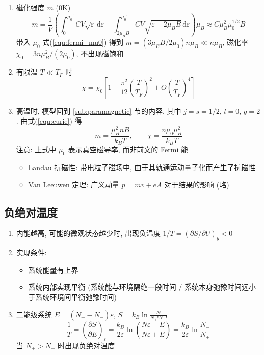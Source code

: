 \documentclass[12pt,a4paper]{article}%
\numberwithin{equation}{section}
\newcommand{\diff}{\,\mathrm{d}}
\begin{document}
\begin{enumerate}
    \item 磁化强度 $m$ ($0$K)
    \begin{equation}
        m = \frac 1V\left(\int_0^{\mu_0'}CV\sqrt\varepsilon\diff\varepsilon - \int_{2\mu_BB}^{\mu_0'}CV\sqrt{\varepsilon-2\mu_BB}\diff\varepsilon\right)\mu_B
        \approx C\mu_B^2\mu_0^{1/2}B
    \end{equation}
    带入 $\mu_0$ 式(\ref{equ:fermi_mu0}) 得到 $m = (3\mu_BB/2\mu_0)n\mu_B \ll n\mu_B$, 磁化率 $\chi_0 = 3n\mu_B^2/(2\mu_0)$, 不出现磁饱和
    \item 有限温 $T\ll T_F$ 时
    \begin{equation}
        \chi = \chi_0\left[1-\frac{\pi^2}{12}\left(\frac{T}{T_F}\right)^2 + O\left(\frac{T}{T_F}\right)^4\right]
    \end{equation}
    \item 高温时, 模型回到 \ref{sub:paramagnetic} 节的内容, 其中 $j=s=1/2$, $l=0$, $g=2$. 由式(\ref{equ:curie}) 得 %
    \begin{equation}
        m = \frac{\mu_B^2 nB}{k_BT}, \qquad \chi = \frac{n\mu_0\mu_B^2}{k_BT}
    \end{equation}
    注意: 上式中 $\mu_0$ 表示真空磁导率, 而非前文的 Fermi 能
    \begin{itemize}
        \item Landau 抗磁性: 
        带电粒子磁场中, 由于其轨通运动量子化而产生了抗磁性
        \item Van Leeuwen 定理: 广义动量 $p = mv + eA$ 对于结果的影响 (略)
    \end{itemize}
\end{enumerate}
\subsection{负绝对温度} %
\label{sub:negtive_temperature}
\begin{enumerate}
    \item 内能越高, 可能的微观状态越少时, 出现负温度 
    $1/T = (\partial S/\partial U)_y < 0$
    \item 实现条件: 
    \begin{itemize}
        \item 系统能量有上界
        \item 系统内部实现平衡 (系统能与环境隔绝一段时间 / 系统本身弛豫时间远小于系统环境间平衡弛豫时间)
    \end{itemize}
    \item 二能级系统 $E = (N_+ - N_- )\varepsilon$, $S = k_B\ln\frac{N!}{N_+!N_-!}$
    \begin{equation}
        \frac 1T = \left(\frac{\partial S}{\partial E}\right)_\varepsilon
        = \frac{k_B}{2\varepsilon}\ln\left(\frac{N\varepsilon-E}{N\varepsilon+E}\right) = \frac{k_B}{2\varepsilon}\ln\frac{N_-}{N_+}
    \end{equation}
    当 $N_+>N_-$ 时出现负绝对温度
\end{enumerate}
\end{document}
